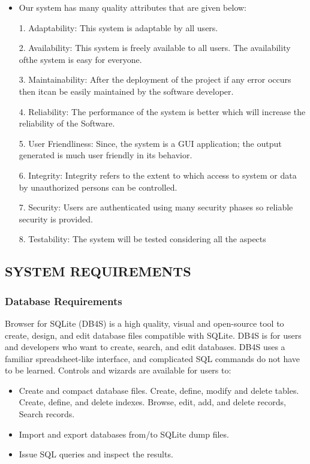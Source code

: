 \documentclass[12pt]{report}
\begin{document}
\normalsize\begin{itemize}\item    Our system has many quality attributes that are given below:

1. Adaptability: This system is adaptable by all users.

2. Availability: This system is freely available to all users. The availability ofthe system
is easy for everyone.

3. Maintainability: After the deployment of the project if any error occurs then itcan be
easily maintained by the software developer.

4. Reliability: The performance of the system is better which will increase the reliability
of the Software.

5. User Friendliness: Since, the system is a GUI application; the output generated is 
much user friendly in its behavior.

6. Integrity: Integrity refers to the extent to which access to system or data by
unauthorized persons can be controlled.

7. Security: Users are authenticated using many security phases so reliable security is 
provided.

8. Testability: The system will be tested considering all the aspects
\end{itemize}

\centering
\raggedright
\subsection{ SYSTEM REQUIREMENTS}

\justifying
\setlength{\parindent}{4em}
\setlength{\parskip}{0.5em}
\renewcommand{\baselinestretch}{1.5}
\subsubsection{ Database Requirements}
Browser for SQLite (DB4S) is a high quality, visual and open-source tool to create, design, and 
edit database files compatible with SQLite. DB4S is for users and developers who want to 
create, search, and edit databases. DB4S uses a familiar spreadsheet-like interface, and
complicated SQL commands do not have to be learned. Controls and wizards are available for
users to:

\normalsize\begin{itemize}\item   Create and compact database files. Create, define, modify and delete tables. Create,
define, and delete indexes. Browse, edit, add, and delete records, Search records.
\item  Import and export databases from/to SQLite dump files.
\item  Issue SQL queries and inspect the results.

\end{itemize}
\end{document}
